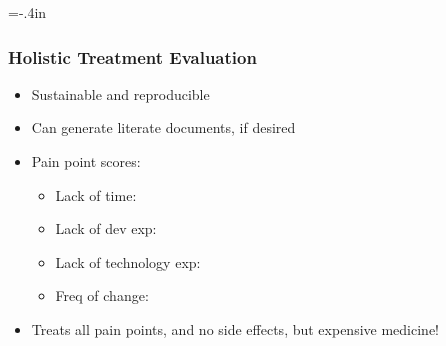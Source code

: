 \documentclass[usenames,dvipsnames]{beamer}
\newcommand{\greencheck}{{\LARGE {\color{ForestGreen}\checkmark}}}
\begin{document}
\hoffset=-.4in %
\begin{frame}[plain]

  
\end{frame}
\hoffset=0in %
  
\begin{frame}
  
  \frametitle{Holistic Treatment Evaluation}
  
  \begin{itemize}
  \item Sustainable and reproducible
  \item Can generate literate documents, if desired
  \item Pain point scores:
  \begin{itemize}
      \item Lack of time: \greencheck %
      \item Lack of dev exp: \greencheck %
      \item Lack of technology exp: \greencheck %
      \item Freq of change: \greencheck %
  \end{itemize}
  \item Treats all pain points, and no side effects, but expensive medicine!
  \end{itemize}
  
\end{frame}
  
\end{document}
